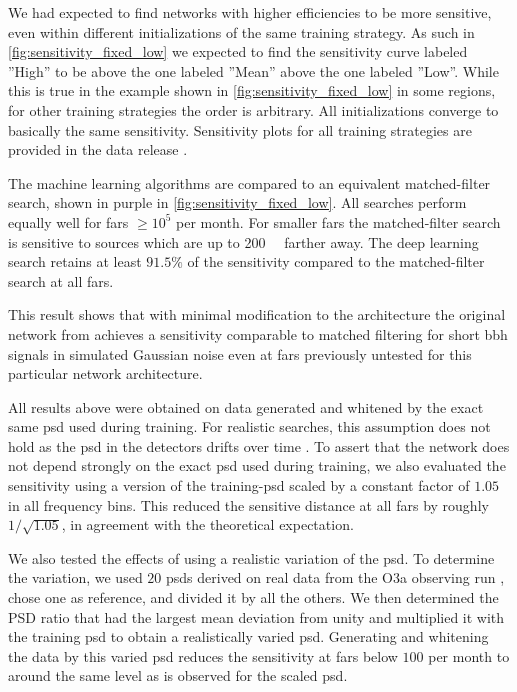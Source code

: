 We had expected to find networks with higher efficiencies to be more sensitive, even within different initializations of the same training strategy. As such in \autoref{fig:sensitivity_fixed_low} we expected to find the sensitivity curve labeled ''High'' to be above the one labeled ''Mean'' above the one labeled ''Low''. While this is true in the example shown in \autoref{fig:sensitivity_fixed_low} in some regions, for other training strategies the order is arbitrary. All initializations converge to basically the same sensitivity. Sensitivity plots for all training strategies are provided in the data release \cite{ml-training-strategies-github}.

The machine learning algorithms are compared to an equivalent matched-filter search, shown in purple in \autoref{fig:sensitivity_fixed_low}. All searches perform equally well for \acrshort{far}s $\geq 10^5$ per month. For smaller \acrshort{far}s the matched-filter search is sensitive to sources which are up to \SI{200}{\mega\parsec} farther away. The deep learning search retains at least $91.5\%$ of the sensitivity compared to the matched-filter search at all \acrshort{far}s.

This result shows that with minimal modification to the architecture the original network from \cite{Gabbard:2017lja} achieves a sensitivity comparable to matched filtering for short \acrshort{bbh} signals in simulated Gaussian noise even at \acrshort{far}s previously untested for this particular network architecture.

All results above were obtained on data generated and whitened by the exact same \acrshort{psd} used during training. For realistic searches, this assumption does not hold as the \acrshort{psd} in the detectors drifts over time \cite{LIGOScientific:2021djp}. To assert that the network does not depend strongly on the exact \acrshort{psd} used during training, we also evaluated the sensitivity using a version of the training-\acrshort{psd} scaled by a constant factor of $1.05$ in all frequency bins. This reduced the sensitive distance at all \acrshort{far}s by roughly $1/\sqrt{1.05}$, in agreement with the theoretical expectation.

We also tested the effects of using a realistic variation of the \acrshort{psd}. To determine the variation, we used $20$ \acrshort{psd}s derived on real data from the O3a observing run \cite{LIGOScientific:2019lzm}, chose one as reference, and divided it by all the others. We then determined the PSD ratio that had the largest mean deviation from unity and multiplied it with the training \acrshort{psd} to obtain a realistically varied \acrshort{psd}. Generating and whitening the data by this varied \acrshort{psd} reduces the sensitivity at \acrshort{far}s below $100$ per month to around the same level as is observed for the scaled \acrshort{psd}.

